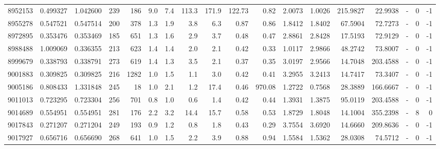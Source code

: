 \begin{tabular}{rrrrrrrrrrrrrrrlrr}
   8952153 & 0.499327 &   1.042600 &  239 &  186 &      9.0 &      7.4 &   113.3 &    171.9 &     122.73 &        0.82 &  2.0073 &  1.0026 &  215.9827 &   22.9938 &             - &        0 &         -1 \\
   8955278 & 0.547521 &   0.547514 &  200 &  378 &      1.3 &      1.9 &     3.8 &      6.3 &       0.87 &        0.86 &  1.8412 &  1.8402 &   67.5904 &   72.7273 &             - &        0 &         -1 \\
   8972895 & 0.353476 &   0.353469 &  185 &  651 &      1.3 &      1.6 &     2.9 &      3.7 &       0.48 &        0.47 &  2.8861 &  2.8428 &   17.5193 &   72.9129 &             - &        0 &         -1 \\
   8988488 & 1.009069 &   0.336355 &  213 &  623 &      1.4 &      1.4 &     2.0 &      2.1 &       0.42 &        0.33 &  1.0117 &  2.9866 &   48.2742 &   73.8007 &             - &        0 &         -1 \\
   8999679 & 0.338793 &   0.338791 &  273 &  619 &      1.4 &      1.3 &     3.5 &      2.1 &       0.37 &        0.35 &  3.0197 &  2.9566 &   14.7048 &  203.4588 &             - &        0 &         -1 \\
   9001883 & 0.309825 &   0.309825 &  216 & 1282 &      1.0 &      1.5 &     1.1 &      3.0 &       0.42 &        0.41 &  3.2955 &  3.2413 &   14.7417 &   73.3407 &             - &        0 &         -1 \\
   9005186 & 0.808433 &   1.331848 &  245 &   18 &      1.0 &      2.1 &     1.2 &     17.4 &       0.46 &      970.08 &  1.2722 &  0.7568 &   28.3889 &  166.6667 &             - &        0 &         -1 \\
   9011013 & 0.723295 &   0.723304 &  256 &  701 &      0.8 &      1.0 &     0.6 &      1.4 &       0.42 &        0.44 &  1.3931 &  1.3875 &   95.0119 &  203.4588 &             - &        0 &         -1 \\
   9014689 & 0.554951 &   0.554951 &  281 &  176 &      2.2 &      3.2 &    14.4 &     15.7 &       0.58 &        0.53 &  1.8729 &  1.8048 &   14.1004 &  355.2398 &             - &        8 &          0 \\
   9017843 & 0.271207 &   0.271204 &  249 &  193 &      0.9 &      1.2 &     0.8 &      1.8 &       0.43 &        0.29 &  3.7554 &  3.6920 &   14.6660 &  209.8636 &             - &        0 &         -1 \\
   9017927 & 0.656716 &   0.656690 &  268 &  641 &      1.0 &      1.5 &     2.2 &      3.9 &       0.88 &        0.94 &  1.5584 &  1.5362 &   28.0308 &   74.5712 &             - &        0 &         -1 \\

\end{tabular}
